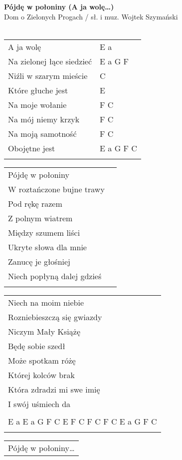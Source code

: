 \documentclass[a5paper]{article}
\begin{document}


\noindent
\fontsize{12pt}{15pt}\selectfont
\textbf{Pójdę w połoniny (A ja wolę…)} \\
\fontsize{8pt}{10pt}\selectfont
Dom o Zielonych Progach / sł. i muz. Wojtek Szymański \\ \\
\fontsize{10pt}{12pt}\selectfont
{}
\begin{tabular}{@{}p{6.50cm}p{3cm}@{}}
\noindent
A ja wolę & E a \\
Na zielonej łące siedzieć & E a G F \\
Niźli w szarym mieście & C \\
Które głuche jest & E \\
Na moje wołanie & F C \\
Na mój niemy krzyk & F C \\
Na moją samotność & F C \\
Obojętne jest & E a G F C \\ \\
\end{tabular}

\noindent
\begin{tabular}{@{}p{5.50cm}p{3cm}@{}}
Pójdę w połoniny \\
W roztańczone bujne trawy \\
Pod rękę razem \\
Z polnym wiatrem \\
Między szumem liści \\
Ukryte słowa dla mnie \\
Zanucę je głośniej \\
Niech popłyną dalej gdzieś \\ \\
\end{tabular}

\noindent
\begin{tabular}{@{}p{6.50cm}@{}}
Niech na moim niebie \\
Rozniebieszczą się gwiazdy \\
Niczym Mały Książę \\
Będę sobie szedł \\
Może spotkam różę \\
Której kolców brak \\
Która zdradzi mi swe imię \\
I swój uśmiech da \\ \\

E a E a G F C E F C F C F C E a G F C \\ \\
\end{tabular}

\noindent
\begin{tabular}{@{}p{5.50cm}@{}}
Pójdę w połoniny…
\end{tabular}
\end{document}
